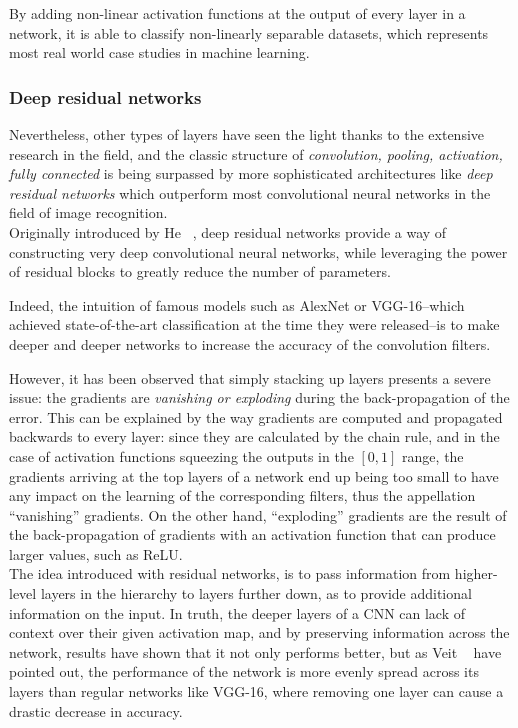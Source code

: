 By adding non-linear activation functions at the output of every layer in a
network, it is able to classify non-linearly separable datasets, which
represents most real world case studies in machine learning.\\


\subsubsection{Deep residual networks}

Nevertheless, other types of layers have seen the light thanks to the extensive
research in the field, and the classic structure of \emph{convolution, pooling,
activation, fully connected} is being surpassed by more sophisticated
architectures like \emph{deep residual networks} which outperform most
convolutional neural networks in the field of image recognition.\\

Originally introduced by He \etal~\cite{He_2016_CVPR}, deep residual networks
provide a way of constructing very deep convolutional neural networks, while
leveraging the power of residual blocks to greatly reduce the number of
parameters.

Indeed, the intuition of famous models such as AlexNet or VGG-16--which
achieved state-of-the-art classification at the time they were released--is to
make deeper and deeper networks to increase the accuracy of the convolution
filters.

However, it has been observed that simply stacking up layers presents a severe
issue: the gradients are \emph{vanishing or exploding} during the
back-propagation of the error. This can be explained by the way gradients are
computed and propagated backwards to every layer: since they are calculated by
the chain rule, and in the case of activation functions squeezing the outputs
in the $[0,1]$ range, the gradients arriving at the top layers of a network end
up being too small to have any impact on the learning of the corresponding
filters, thus the appellation ``vanishing'' gradients. On the other hand,
``exploding'' gradients are the result of the back-propagation of gradients
with an activation function that can produce larger values, such as ReLU.\\

The idea introduced with residual networks, is to pass information from
higher-level layers in the hierarchy to layers further down, as to provide
additional information on the input. In truth, the deeper layers of a CNN can
lack of context over their given activation map, and by preserving information
across the network, results have shown that it not only performs better, but
as Veit \etal~\cite{ResnetBehavior} have pointed out, the performance of the
network is more evenly spread across its layers than regular networks like
VGG-16, where removing one layer can cause a drastic decrease in accuracy.

